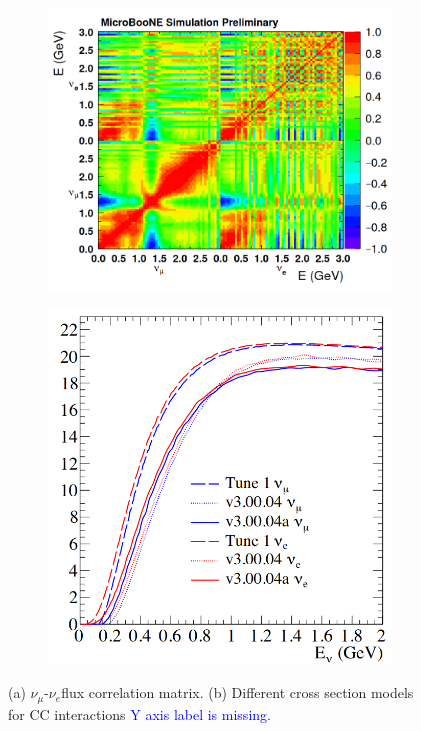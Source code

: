 \begin{figure}[ht] 
\begin{center}
    \begin{subfigure}[b]{0.42\textwidth}
    \centering
    \includegraphics[width=1.00\textwidth]{introduction/fluxcorrelation.png}
    \caption{\label{fig:numuconstraint:flux}}
    \end{subfigure}
    \begin{subfigure}[b]{0.3\textwidth}
    \centering
    \includegraphics[width=1.00\textwidth]{introduction/xsec_mcc8_mcc9.png}
    \caption{\label{fig:numuconstraint:xsec}}
    \end{subfigure}
\caption{\label{fig:numuconstraint} (a) $\nu_{\mu}$-$\nu_e$flux correlation matrix. (b) Different cross section models for CC interactions \textcolor{blue}{Y axis label is missing}.  }
\end{center}
\end{figure}

